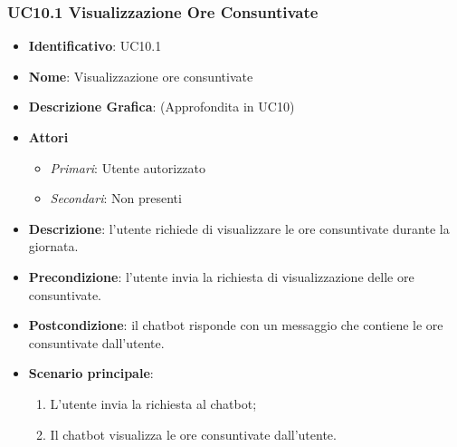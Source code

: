 \subsubsection{UC10.1 Visualizzazione Ore Consuntivate}
\begin{itemize}
	\item \textbf{Identificativo}: UC10.1
	\item \textbf{Nome}: Visualizzazione ore consuntivate
	\item \textbf{Descrizione Grafica}: (Approfondita in UC10)
	\item \textbf{Attori}
	\begin{itemize}
		\item \textit{Primari}: Utente autorizzato
		\item \textit{Secondari}: Non presenti
	\end{itemize}
	\item \textbf{Descrizione}: l'utente richiede di visualizzare le ore consuntivate durante la giornata.
	\item \textbf{Precondizione}: l'utente invia la richiesta di visualizzazione delle ore consuntivate.
	\item \textbf{Postcondizione}: il chatbot risponde con un messaggio che contiene le ore consuntivate dall'utente.
	\item \textbf{Scenario principale}: 
	\begin{enumerate}
		\item L'utente invia la richiesta al chatbot;
		\item Il chatbot visualizza le ore consuntivate dall'utente.
	\end{enumerate}
\end{itemize}

